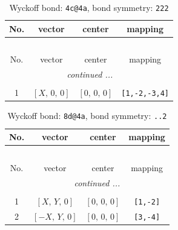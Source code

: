 \documentclass[fleqn,8pt]{jsarticle}
\begin{document}
\renewcommand{\arraystretch}{1.2}
\begin{longtable}{cccc}
\caption{Wyckoff bond: {\tt 4c@4a}, bond symmetry: {\tt 222}}
 \\
 \hline \hline
No. & vector & center & mapping \\ \hline \endfirsthead

\multicolumn{3}{l}{\tablename\ \thetable{}} \\
 \hline \hline
No. & vector & center & mapping \\ \hline \endhead

 \hline \hline
\multicolumn{3}{r}{\footnotesize\it continued ...} \\ \endfoot

 \hline \hline
\multicolumn{3}{r}{} \\ \endlastfoot

1 & $\left[ X,\, 0,\, 0 \right]$ & $\left[ 0,\, 0,\, 0 \right]$ & {\tt [1,-2,-3,4]} \\
\end{longtable}
\renewcommand{\arraystretch}{1.2}
\begin{longtable}{cccc}
\caption{Wyckoff bond: {\tt 8d@4a}, bond symmetry: {\tt ..2}}
 \\
 \hline \hline
No. & vector & center & mapping \\ \hline \endfirsthead

\multicolumn{3}{l}{\tablename\ \thetable{}} \\
 \hline \hline
No. & vector & center & mapping \\ \hline \endhead

 \hline \hline
\multicolumn{3}{r}{\footnotesize\it continued ...} \\ \endfoot

 \hline \hline
\multicolumn{3}{r}{} \\ \endlastfoot

1 & $\left[ X,\, Y,\, 0 \right]$ & $\left[ 0,\, 0,\, 0 \right]$ & {\tt [1,-2]} \\ \hline
2 & $\left[ - X,\, Y,\, 0 \right]$ & $\left[ 0,\, 0,\, 0 \right]$ & {\tt [3,-4]} \\
\end{longtable}
\renewcommand{\arraystretch}{1.2}
\end{document}
